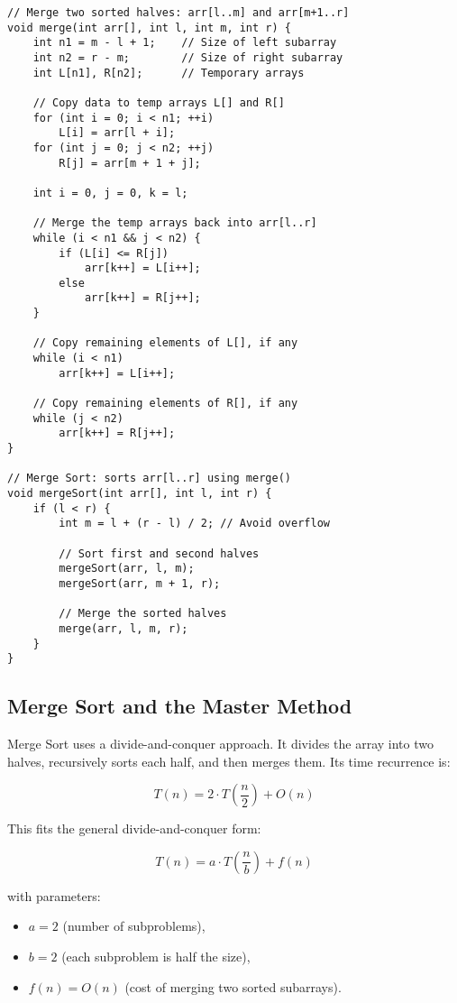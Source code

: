 \documentclass{article}
\begin{document}
\begin{lstlisting}[style=cppstyle]
// Merge two sorted halves: arr[l..m] and arr[m+1..r]
void merge(int arr[], int l, int m, int r) {
    int n1 = m - l + 1;    // Size of left subarray
    int n2 = r - m;        // Size of right subarray
    int L[n1], R[n2];      // Temporary arrays

    // Copy data to temp arrays L[] and R[]
    for (int i = 0; i < n1; ++i)
        L[i] = arr[l + i];
    for (int j = 0; j < n2; ++j)
        R[j] = arr[m + 1 + j];

    int i = 0, j = 0, k = l;

    // Merge the temp arrays back into arr[l..r]
    while (i < n1 && j < n2) {
        if (L[i] <= R[j])
            arr[k++] = L[i++];
        else
            arr[k++] = R[j++];
    }

    // Copy remaining elements of L[], if any
    while (i < n1)
        arr[k++] = L[i++];

    // Copy remaining elements of R[], if any
    while (j < n2)
        arr[k++] = R[j++];
}

// Merge Sort: sorts arr[l..r] using merge()
void mergeSort(int arr[], int l, int r) {
    if (l < r) {
        int m = l + (r - l) / 2; // Avoid overflow

        // Sort first and second halves
        mergeSort(arr, l, m);
        mergeSort(arr, m + 1, r);

        // Merge the sorted halves
        merge(arr, l, m, r);
    }
}
\end{lstlisting}

\subsection{Merge Sort and the Master Method}

Merge Sort uses a divide-and-conquer approach. It divides the array into two halves, recursively sorts each half, and then merges them. Its time recurrence is:

\[
T(n) = 2 \cdot T\left(\frac{n}{2}\right) + O(n)
\]

This fits the general divide-and-conquer form:

\[
T(n) = a \cdot T\left(\frac{n}{b}\right) + f(n)
\]

with parameters:
\begin{itemize}
    \item $a = 2$ (number of subproblems),
    \item $b = 2$ (each subproblem is half the size),
    \item $f(n) = O(n)$ (cost of merging two sorted subarrays).
\end{itemize}
\end{document}
